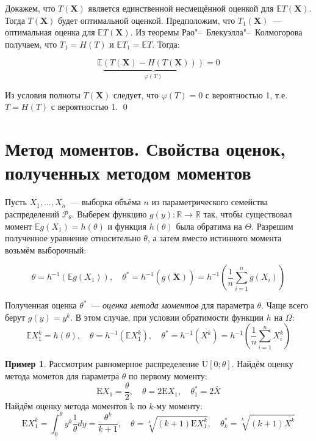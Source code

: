 \documentclass[oneside,final,14pt]{extreport}
\renewenvironment{proof}{{\bfseries Доказательство.}}{\qed}
\theoremstyle{plain}
\theoremstyle{definition}
\newtheorem*{exmp}{Пример}
\theoremstyle{named}
\begin{document}
\begin{proof}
Докажем, что $T(\mathbf{X})$ является единственной несмещённой оценкой для $\mathbb{E}T(\mathbf{X})$. Тогда $T(\mathbf{X})$ будет оптимальной оценкой. Предположим, что $T_1(\mathbf{X})$~--- оптимальная оценка для $\mathbb{E}T(\mathbf{X})$. Из теоремы Рао"--~Блекуэлла"--~Колмогорова получаем, что $T_{1}=H(T)$ и $\mathbb{E} T_{1}=\mathbb{E} T$. Тогда:

\begin{equation*}
    \mathbb{E} \underbrace{(T(\mathbf{X})-H(T(\mathbf{X})))}_{\varphi(T)}=0
\end{equation*}

Из условия полноты $T(\mathbf{X})$ следует, что $\varphi(T)=0$ с вероятностью 1, т.е. $T=H(T)$ с вероятностью 1.
\end{proof}

\section{Метод моментов. Свойства оценок, полученных методом моментов}

Пусть $X_1, \ldots, X_n$~--- выборка объёма $n$ из параметрического семейства распределений $\mathcal{P}_\theta$. Выберем функцию $g(y): \mathbb{R} \rightarrow \mathbb{R}$ так, чтобы существовал момент $\mathbb{E} g\left(X_{1}\right)=h(\theta)$ и функция $h(\theta)$ была обратима на $\Theta$. Разрешим полученное уравнение относительно $\theta$, а затем вместо истинного момента возьмём выборочный:

\begin{equation*}
    \theta=h^{-1}\left(\mathbb{E} g\left(X_{1}\right)\right), \quad \theta^{*}=h^{-1}(\overline{g(\mathbf{X})})=h^{-1}\left(\frac{1}{n} \sum\limits_{i=1}^{n} g\left(X_{i}\right)\right)
\end{equation*}

Полученная оценка $\theta^{*}$~--- {\it оценка метода моментов} для параметра $\theta$. Чаще всего берут $g(y)=y^{k}$. В этом случае, при условии обратимости функции $h$ на $\Omega$:
\begin{equation*}
    \mathbb{E} X_{1}^{k}=h(\theta), \quad \theta=h^{-1}\left(\mathbb{E} X_{1}^{k}\right), \quad \theta^{*}=h^{-1}(\overline{X^{k}})=h^{-1}\left(\frac{1}{n} \sum\limits_{i=1}^{n} X_{i}^{k}\right)
\end{equation*}

\begin{exmp}
    Рассмотрим равномерное распределение $\mathrm{U}[0;\theta]$. Найдём оценку метода мометов для параметра $\theta$ по первому моменту:
    \begin{equation*}
        \mathrm{E} X_{1}=\frac{\theta}{2}, \quad \theta=2 \mathrm{E} X_{1}, \quad \theta_{1}^{*}=2 \bar{X}
    \end{equation*}
    Найдём оценку метода моментов k по $k$-му моменту:
    \begin{equation*}
        \mathrm{E} X_{1}^{k}=\int_{0}^{\theta} y^{k} \frac{1}{\theta} d y=\frac{\theta^{k}}{k+1}, \quad \theta=\sqrt[k]{(k+1) \mathrm{E} X_{1}^{k}}, \quad \theta_{k}^{*}=\sqrt[k]{(k+1) \overline{X^{k}}}
    \end{equation*}
\end{exmp}
\end{document}
